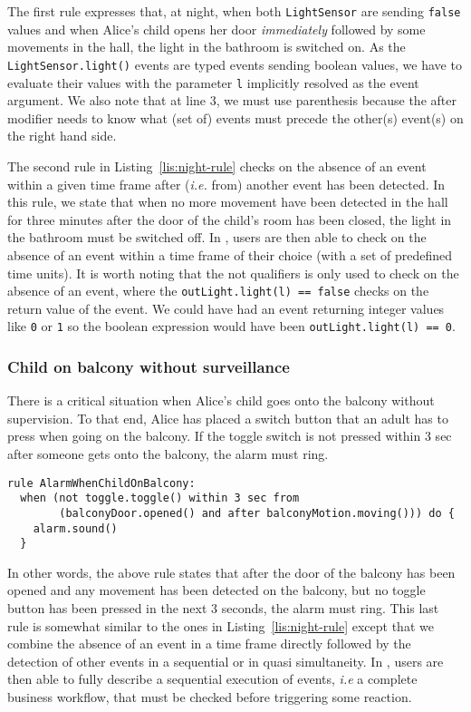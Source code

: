 The first rule expresses that, at night, when both \texttt{LightSensor} are sending \texttt{false} values and when Alice's child opens her door \textit{immediately} followed by some movements in the hall, the light in the bathroom is switched on. As the \texttt{LightSensor.light()} events are typed events sending boolean values, we have to evaluate their values with the parameter \texttt{l} implicitly resolved as the event argument. We also note that at line 3, we must use parenthesis because the \textsf{after} modifier needs to know what (set of) events must precede the other(s) event(s) on the right hand side. 

The second rule in Listing~\ref{lis:night-rule} checks on the absence of an event \textsf{within} a given time frame after (\textit{i.e.} \textsf{from}) another event has been detected. In this rule, we state that when no more movement have been detected in the hall for three minutes after the door of the child's room has been closed, the light in the bathroom must be switched off. In \IOTDSL, users are then able to check on the absence of an event within a time frame of their choice (with a set of predefined time units). It is worth noting that the \textsf{not} qualifiers is only used to check on the absence of an event, where the \texttt{outLight.light(l) == false} checks on the return value of the event. We could have had an event returning \textsf{integer} values like \texttt{0} or \texttt{1} so the boolean expression would have been \texttt{outLight.light(l) == 0}.

\subsubsection*{Child on balcony without surveillance}
	
There is a critical situation when Alice's child goes onto the balcony without supervision. To that end, Alice has placed a switch button that an adult has to press when going on the balcony. If the toggle switch is not pressed within 3 sec after someone gets onto the balcony, the alarm must ring.

\begin{lstlisting}[language=iotdsl,label=lis:balcony-rule,caption=\IOTDSL business rules ring the alarm when Alice's child alone on balcony]
rule AlarmWhenChildOnBalcony:	
  when (not toggle.toggle() within 3 sec from 
  		(balconyDoor.opened() and after balconyMotion.moving())) do {
    alarm.sound()
  }
\end{lstlisting}

In other words, the above rule states that after the door of the balcony has been opened and any movement has been detected on the balcony, but no toggle button has been pressed in the next 3 seconds, the alarm must ring. This last rule is somewhat similar to the ones in Listing~\ref{lis:night-rule} except that we combine the absence of an event in a time frame directly followed by the detection of other events in a sequential or in quasi simultaneity. In \IOTDSL, users are then able to fully describe a sequential execution of events, \textit{i.e} a complete business workflow, that must be checked before triggering some \textsf{reaction}.

